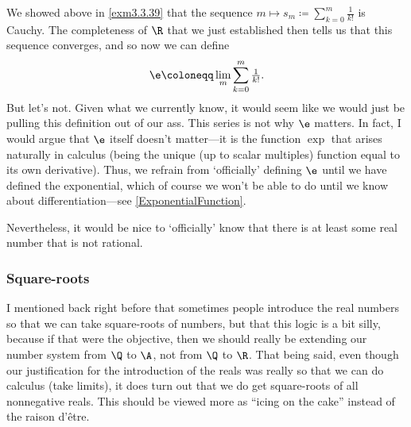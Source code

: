 We showed above in \cref{exm3.3.39} that the sequence $m\mapsto s_m\coloneqq \sum _{k=0}^m\frac{1}{k!}$ is Cauchy.  The completeness of $\R$ that we just established then tells us that this sequence converges, and so now we can define
\begin{equation}
\e \coloneqq \lim _m\sum _{k=0}^m\tfrac{1}{k!}.
\end{equation}
But let's not.  Given what we currently know, it would seem like we would just be pulling this definition out of our ass.  This series is not why $\e$ matters.  In fact, I would argue that $\e$ itself doesn't matter---it is the function $\exp$ that arises naturally in calculus (being the unique (up to scalar multiples) function equal to its own derivative).  Thus, we refrain from `officially' defining $\e$ until we have defined the exponential, which of course we won't be able to do until we know about differentiation---see \cref{ExponentialFunction}.

Nevertheless, it would be nice to `officially' know that there is at least some real number that is not rational.

\subsubsection{Square-roots}\label{sssSquareRoots}

I mentioned back right before  that sometimes people introduce the real numbers so that we can take square-roots of numbers, but that this logic is a bit silly, because if that were the objective, then we should really be extending our number system from $\Q$ to $\A$, not from $\Q$ to $\R$.  That being said, even though our justification for the introduction of the reals was really so that we can do calculus (take limits), it does turn out that we do get square-roots of all nonnegative reals.  This should be viewed more as ``icing on the cake'' instead of the raison d'\^{e}tre.

